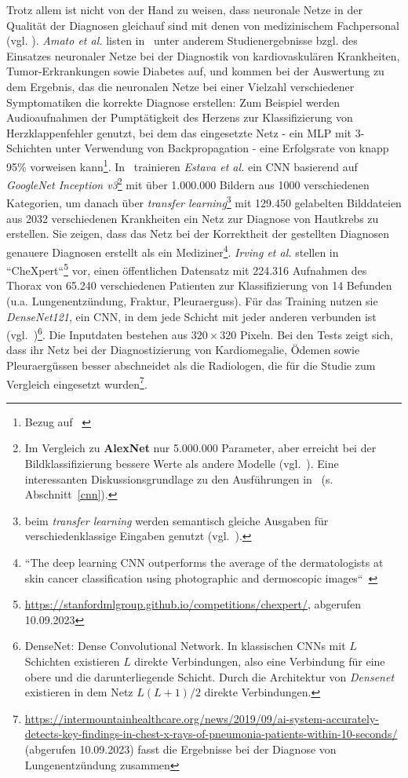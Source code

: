 Trotz allem ist nicht von der Hand zu weisen, dass neuronale Netze in der Qualität der Diagnosen gleichauf sind mit denen von medizinischem Fachpersonal (vgl. \cite[1]{SZJ+19}). \textit{Amato et al.} listen in~\cite{ALP+13} unter anderem Studienergebnisse bzgl. des Einsatzes neuronaler Netze bei der Diagnostik von kardiovaskulären Krankheiten, Tumor-Erkrankungen sowie Diabetes auf, und kommen bei der Auswertung zu dem Ergebnis, das die neuronalen Netze bei einer Vielzahl verschiedener Symptomatiken die korrekte Diagnose erstellen: Zum Beispiel werden Audioaufnahmen der Pumptätigkeit des Herzens zur Klassifizierung von Herzklappenfehler genutzt, bei dem das eingesetzte Netz - ein MLP mit 3-Schichten unter Verwendung von Backpropagation - eine Erfolgsrate von knapp 95\% vorweisen kann\footnote{Bezug auf ~\cite[71]{Ugu12}}. In~\cite{EKN+17} trainieren \textit{Estava et al.} ein CNN basierend auf \textit{GoogleNet Inception v3}\footnote{
    Im Vergleich zu \textbf{AlexNet} nur 5.000.000 Parameter, aber erreicht bei der Bildklassifizierung bessere Werte als andere Modelle (vgl.~\cite{SVI+15}). Eine interessanten Diskussionsgrundlage zu den Ausführungen in~\cite{Cun89} (s. Abschnitt~\ref{cnn}).
} mit über 1.000.000 Bildern aus 1000 verschiedenen Kategorien, um danach über \textit{transfer learning}\footnote{
    beim \textit{transfer learning} werden semantisch gleiche Ausgaben für verschiedenklassige Eingaben genutzt (vgl.~\cite[602 f.]{GBC18}).
} mit 129.450 gelabelten Bilddateien aus 2032 verschiedenen Krankheiten ein Netz zur Diagnose von Hautkrebs zu erstellen. Sie zeigen, dass das Netz bei der Korrektheit der gestellten Diagnosen genauere Diagnosen erstellt als ein Mediziner\footnote{
    ``The deep learning CNN outperforms the average of the dermatologists at skin cancer classification using photographic and dermoscopic images``~\cite[3, Figure 2]{EKN+17}
}.
\textit{Irving et al.} stellen in~\cite{IRK+19} ``CheXpert``\footnote{
    \url{https://stanfordmlgroup.github.io/competitions/chexpert/}, abgerufen 10.09.2023
} vor, einen öffentlichen Datensatz mit 224.316 Aufnahmen des Thorax von 65.240 verschiedenen Patienten zur Klassifizierung von 14 Befunden (u.a. Lungenentzündung, Fraktur, Pleuraerguss). Für das Training nutzen sie \textit{DenseNet121}, ein CNN, in dem jede Schicht mit jeder anderen verbunden ist (vgl.~\cite{HLW16})\footnote{
    DenseNet: Dense Convolutional Network. In klassischen CNNs mit $L$ Schichten existieren $L$ direkte Verbindungen, also eine Verbindung für eine obere und die darunterliegende Schicht. Durch die Architektur von \textit{Densenet} existieren in dem Netz $L(L +1)/2$ direkte Verbindungen.
}. Die Inputdaten bestehen aus $320 \times 320$ Pixeln. Bei den Tests zeigt sich, dass ihr Netz bei der Diagnostizierung von Kardiomegalie, Ödemen sowie Pleuraergüssen besser abschneidet als die Radiologen, die für die Studie zum Vergleich eingesetzt wurden\footnote{
    \url{https://intermountainhealthcare.org/news/2019/09/ai-system-accurately-detects-key-findings-in-chest-x-rays-of-pneumonia-patients-within-10-seconds/} (abgerufen 10.09.2023) fasst die Ergebnisse bei der Diagnose von Lungenentzündung zusammen
}.

